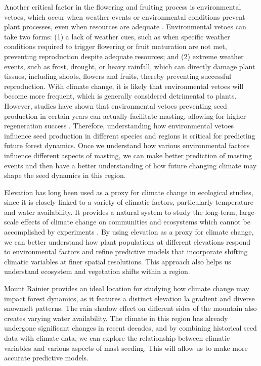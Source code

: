 \documentclass[11pt,letter]{article}
\begin{document}
Another critical factor in the flowering and fruiting process is environmental vetoes, which occur when weather events or environmental conditions prevent plant processes, even when resources are adequate \citep{bogdziewicz2022will} . Environmental vetoes can take two forms: (1) a lack of weather cues, such as when specific weather conditions required to trigger flowering or fruit maturation are not met, preventing reproduction despite adequate resources; and (2) extreme weather events, such as frost, drought, or heavy rainfall, which can directly damage plant tissues, including shoots, flowers and fruits, thereby preventing successful reproduction. With climate change, it is likely that environmental vetoes will become more frequent, which is generally considered detrimental to plants. However, studies have shown that environmental vetoes preventing seed production in certain years can actually facilitate masting, allowing for higher regeneration success \citep{bogdziewicz2018correlated, bogdziewicz2019environmental}. Therefore, understanding how environmental vetoes influence seed production in different species and regions is critical for predicting future forest dynamics.  Once we understand how various environmental factors influence different aspects of masting, we can make better prediction of masting events and then have a better understanding of how future changing climate may shape the seed dynamics in this region.\par

Elevation has long been used as a proxy for climate change in ecological studies, since it is closely linked to a variety of climatic factors, particularly temperature and water availability. It provides a natural system to study the long-term, large-scale effects of climate change on communities and ecosystems which cannot be accomplished by experiments \citep{sundqvist2013community}. By using elevation as a proxy for climate change, we can better understand how plant populations at different elevations respond to environmental factors and refine predictive models that incorporate shifting climatic variables at finer spatial resolutions. This approach also helps us understand ecosystem and vegetation shifts within a region.\par

Mount Rainier provides an ideal location for studying how climate change may impact forest dynamics, as it features a distinct elevation la gradient and diverse snowmelt patterns. The rain shadow effect on different sides of the mountain also creates varying water availability. The climate in this region has already undergone significant changes in recent decades, and by combining historical seed data with climate data, we can explore the relationship between climatic variables and various aspects of mast seeding. This will allow us to make more accurate predictive models.\par
\end{document}
